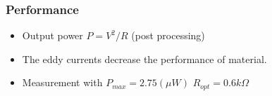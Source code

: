 \documentclass[compress]{beamer}
\begin{document}
\begin{frame}\frametitle{Performance}
\hspace{0.5cm}
\begin{itemize}[label=$\bullet$, font=\small, leftmargin=*]
\item Output power $P=V^2/R$ (post processing)
\item The eddy currents decrease the performance of material.
\item Measurement with $P_{max}=2.75(\mu W)$ $R_{opt}=0.6 k\Omega$
\end{itemize}
\end{frame}
\end{document}
